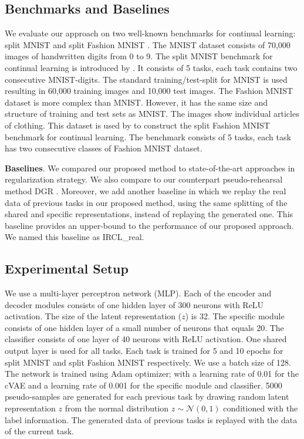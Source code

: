 \documentclass[letterpaper]{article} %
\begin{document}
\subsection{Benchmarks and Baselines}
We evaluate our approach on two well-known benchmarks for continual learning: split MNIST \cite{lecun1998mnist,zenke2017continual} and split Fashion MNIST \cite{xiao2017fashion,Farquhar2019a}. The MNIST dataset \cite{lecun1998mnist} consists of 70,000 images of handwritten digits from
0 to 9. The split MNIST benchmark for continual learning is introduced by \cite{zenke2017continual}. It consists of 5 tasks, each task contains two consecutive MNIST-digits. The standard training/test-split for MNIST is used resulting in 60,000 training images and 10,000 test images. The Fashion MNIST dataset is more complex than MNIST. However, it has the same size and structure of training and test sets as MNIST. The images show individual articles of clothing. This dataset is used by \cite{Farquhar2019a} to construct the split Fashion MNIST benchmark for continual learning. The benchmark consists of 5 tasks, each task has two consecutive classes of Fashion MNIST dataset.

\textbf{Baselines}. We compared our proposed method to state-of-the-art approaches in regularization strategy. We also compare to our counterpart pseudo-rehearsal method DGR \cite{shin2017continual}. Moreover, we add another baseline in which we replay the real data of previous tasks in our proposed method, using the same splitting of the shared and specific representations, instead of replaying the generated one. This baseline provides an upper-bound to the performance of our proposed approach. We named this baseline as IRCL\_real.

\subsection{Experimental Setup}
We use a multi-layer perceptron network (MLP). Each of the encoder and decoder modules consists of one hidden layer of 300 neurons with ReLU activation. The size of the latent representation ($z$) is 32. The specific module consists of one hidden layer of a small number of neurons that equals 20. The classifier consists of one layer of 40 neurons with ReLU activation. One shared output layer is used for all tasks. Each task is trained for 5 and 10 epochs for split MNIST and split Fashion MNIST respectively. We use a batch size of 128.  The network is trained using Adam optimizer; with a learning rate of 0.01 for the cVAE and a learning rate of 0.001 for the specific module and classifier. 5000 pseudo-samples are generated for each previous task by drawing random latent representation $z$ from the normal distribution $z \sim \mathcal{N}(0,1)$ conditioned with the label information. The generated data of previous tasks is replayed with the data of the current task.
\end{document}
